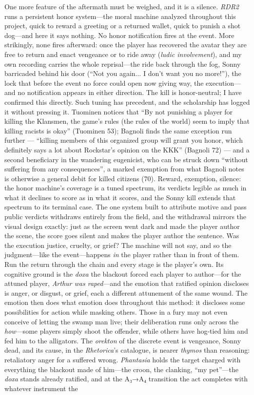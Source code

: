 \documentclass{article}
\begin{document}
One more feature of the aftermath must be weighed, and it is a silence. \textit{RDR2} runs a persistent honor system---the moral machine analyzed throughout this project, quick to reward a greeting or a returned wallet, quick to punish a shot dog---and here it says nothing. No honor notification fires at the event. More strikingly, none fires afterward: once the player has recovered the avatar they are free to return and enact vengeance or to ride away (\textit{ludic involvement}), and my own recording carries the whole reprisal---the ride back through the fog, Sonny barricaded behind his door (``Not you again... I don't want you no more!''), the lock that before the event no force could open now giving way, the execution---and no notification appears in either direction. The kill is honor-neutral; I have confirmed this directly.
Such tuning has precedent, and the scholarship has logged it without pressing it. Tuominen notices that ``By not punishing a player for killing the Klansmen, the game's rules (the rules of the world) seem to imply that killing racists is okay'' (Tuominen 53); Bagnoli finds the same exception run further — ``killing members of this organized group will grant you honor, which definitely says a lot about Rockstar's opinion on the KKK'' (Bagnoli 72) — and a second beneficiary in the wandering eugenicist, who can be struck down ``without suffering from any consequences'', a marked exemption from what Bagnoli notes is otherwise a general debit for killed citizens (70). Reward, exemption, silence: the honor machine's coverage is a tuned spectrum, its verdicts legible as much in what it declines to score as in what it scores, and the Sonny kill extends that spectrum to its terminal case. The one system built to attribute motive and pass public verdicts withdraws entirely from the field, and the withdrawal mirrors the visual design exactly: just as the screen went dark and made the player author the scene, the score goes silent and makes the player author the sentence. Was the execution justice, cruelty, or grief? The machine will not say, and so the judgment---like the event---happens \textit{in} the player rather than in front of them. Run the return through the chain and every stage is the player's own. Its cognitive ground is the \textit{doxa} the blackout forced each player to author---for the attuned player, \textit{Arthur was raped}---and the emotion that ratified opinion discloses is anger, or disgust, or grief, each a different attunement of the same wound. The emotion then does what emotion does throughout this method: it discloses some possibilities for action while masking others. Those in a fury may not even conceive of letting the swamp man live; their deliberation runs only across the \textit{how}---some players simply shoot the offender, while others have hog-tied him and fed him to the alligators. The \textit{orekton} of the discrete event is vengeance, Sonny dead, and its cause, in the \textit{Rhetorica}'s catalogue, is nearer \textit{thymos} than reasoning: retaliatory anger for a suffered wrong. \textit{Phantasia} holds the target charged with everything the blackout made of him---the croon, the clanking, ``my pet''---the \textit{doxa} stands already ratified, and at the A₃→A₄ transition the act completes with whatever instrument the 
\end{document}
